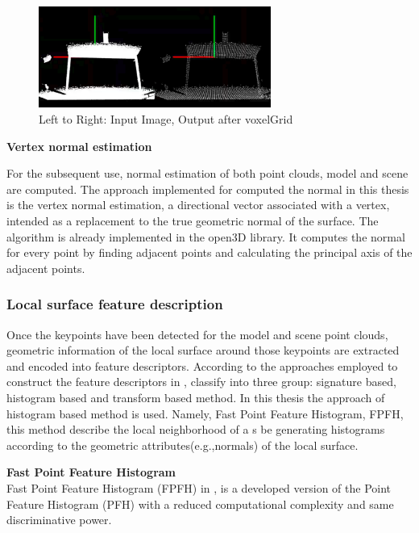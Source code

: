 \begin{figure}[!h]
\begin{center}
\includegraphics[width=3in]{figures03/voxelcloud1.png}
\caption{Left to Right: Input Image, Output after voxelGrid}%
\label{fig:voxeldown}
\end{center}
\end{figure}


\textbf{Vertex normal estimation}

For the subsequent use, normal estimation of both point clouds, model and scene are computed. The approach implemented for computed the normal in this thesis is the vertex normal estimation, a directional vector associated with a vertex, intended as a replacement to the true geometric normal of the surface. The algorithm is already implemented in the open3D \cite{open3d} library. 
It computes the normal for every point by finding adjacent points and calculating the principal axis of the adjacent points.

\subsubsection{Local surface feature description}

Once the keypoints have been detected for the model and scene point clouds, geometric information of the local surface around those keypoints are extracted and encoded into feature descriptors. According to the approaches employed to construct the feature descriptors in \cite{survey}, classify into three group: signature based, histogram based and transform based method. In this thesis the approach of histogram based method is used. Namely, Fast Point Feature Histogram, FPFH, this method describe the local neighborhood of a s be generating histograms according to the geometric attributes(e.g.,normals) of the local surface.

\noindent
\textbf{Fast Point Feature Histogram}\\
Fast Point Feature Histogram (FPFH) in \cite{algFpfh}, is a developed version of the Point Feature Histogram (PFH) \cite{algFpfh} with a reduced computational complexity and same discriminative power. 

